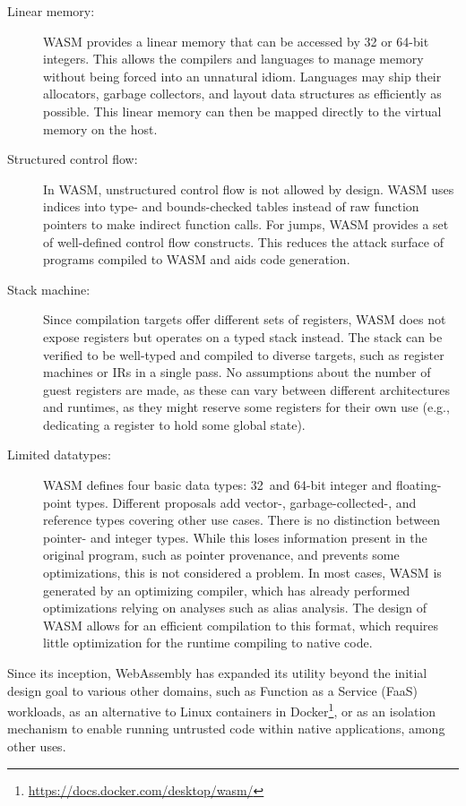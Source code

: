 \begin{description}
    \item[Linear memory:] \Ac{WASM} provides a linear memory that can be accessed by 32 or 64-bit integers.
    This allows the compilers and languages to manage memory without being forced into an unnatural idiom.
    Languages may ship their allocators, garbage collectors, and layout data structures as efficiently as possible.
    This linear memory can then be mapped directly to the virtual memory on the host.
    \item[Structured control flow:] In \ac{WASM}, unstructured control flow is not allowed by design.
    \ac{WASM} uses indices into type- and bounds-checked tables instead of raw function pointers to make indirect function calls.
    For jumps, \ac{WASM} provides a set of well-defined control flow constructs.
    This reduces the attack surface of programs compiled to \ac{WASM} and aids code generation.
    \item[Stack machine:] Since compilation targets offer different sets of registers, \ac{WASM} does not expose registers but operates on a typed stack instead.
    The stack can be verified to be well-typed and compiled to diverse targets, such as register machines or \acp{IR} in a single pass.
    No assumptions about the number of guest registers are made, as these can vary between different architectures and runtimes, as they might reserve some registers for their own use (e.g., dedicating a register to hold some global state).
    \item[Limited datatypes:] \Ac{WASM} defines four basic data types: 32\, and 64-bit integer and floating-point types.
    Different proposals add \mbox{vector-}, \mbox{garbage-collected-}, and reference types covering other use cases.
    There is no distinction between pointer- and integer types.
    While this loses information present in the original program, such as pointer provenance, and prevents some optimizations, this is not considered a problem.
    In most cases, \ac{WASM} is generated by an optimizing compiler, which has already performed optimizations relying on analyses such as alias analysis.
    The design of \ac{WASM} allows for an efficient compilation to this format, which requires little optimization for the runtime compiling to native code.
\end{description}

Since its inception, WebAssembly has expanded its utility beyond the initial design goal to various other domains, such as Function as a Service (FaaS) workloads, as an alternative to Linux containers in Docker\footnote{\url{https://docs.docker.com/desktop/wasm/}}, or as an isolation mechanism to enable running untrusted code within native applications, among other uses.

